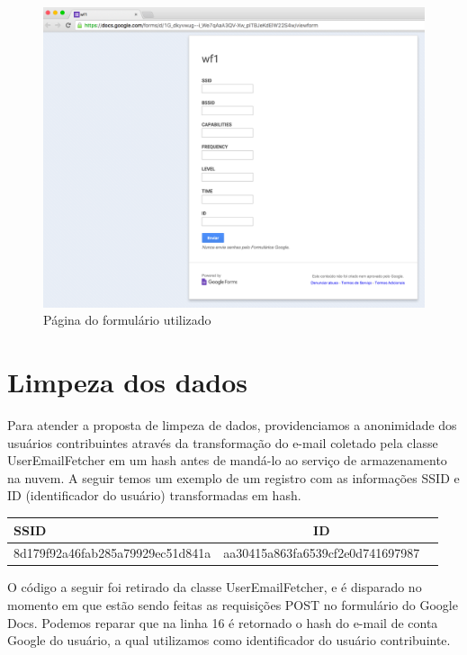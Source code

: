 \documentclass[12pt, %
openright, 
oneside,
a4paper,
brazil]{facom-ufu-abntex2}
\begin{document}
 
\begin{figure}[hbt]
  \includegraphics[scale=0.4]{form}
  \caption{Página do formulário utilizado}
\end{figure}


\section{Limpeza dos dados}
Para atender a proposta de limpeza de dados, providenciamos a anonimidade dos usuários contribuintes através da transformação do e-mail coletado pela classe UserEmailFetcher em um hash antes de mandá-lo ao serviço de armazenamento na nuvem.
A seguir temos um exemplo de um registro com as informações \ac{SSID} e ID (identificador do usuário) transformadas em hash. 

\begin{center}
  \begin{tabular}{ l | c | r }
    \hline
    SSID & ID\\ \hline
    8d179f92a46fab285a79929ec51d841a & aa30415a863fa6539cf2e0d741697987 \\ \hline
  \end{tabular}
\end{center}


O código a seguir foi retirado da classe UserEmailFetcher, e é disparado no momento em que estão sendo feitas as requisições POST no formulário do Google Docs. Podemos reparar que na linha 16 é retornado o hash do e-mail de conta Google do usuário, a qual utilizamos como identificador do usuário contribuinte. 
\end{document}
